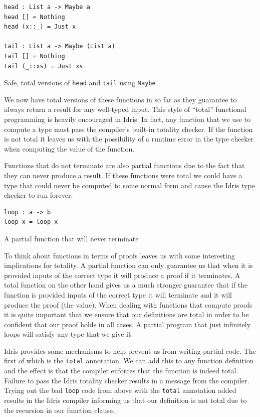 \documentclass[a4paper, notitlepage]{report}
\begin{document}
\begin{listing}[H]
\begin{verbatim}
head : List a -> Maybe a
head [] = Nothing
head (x::_) = Just x

tail : List a -> Maybe (List a)
tail [] = Nothing
tail (_::xs) = Just xs
\end{verbatim}
\caption{Safe, total versions of \texttt{head} and \texttt{tail} using \texttt{Maybe}}
\end{listing}

We now have total versions of these functions in so far as they guarantee to
always return a result for any well-typed input. This style of ``total''
functional programming is heavily encouraged in Idris. In fact, any function
that we use to compute a type must pass the compiler's built-in totality
checker. If the function is not total it leaves us with the possibility of a
runtime error in the type checker when computing the value of the function.

Functions that do not terminate are also partial functions due to the fact that
they can never produce a result. If these functions were total we could have a
type that could never be computed to some normal form and cause the Idris type
checker to run forever.

\begin{listing}[H]
\begin{verbatim}
loop : a -> b
loop x = loop x
\end{verbatim}
\caption{A partial function that will never terminate}
\end{listing}

To think about functions in terms of proofs leaves us with some interesting
implications for totality. A partial function can only guarantee us that when it
is provided inputs of the correct type it will produce a proof if it terminates.
A total function on the other hand gives us a much stronger guarantee that if
the function is provided inputs of the correct type it will terminate and it
will produce the proof (the value). When dealing with functions that compute
proofs it is quite important that we ensure that our definitions are total in
order to be confident that our proof holds in all cases. A partial program that
just infinitely loops will satisfy any type that we give it.

Idris provides some mechanisms to help prevent us from writing partial code. The
first of which is the \texttt{total} annotation. We can add this to any function
definition and the effect is that the compiler enforces that the function is
indeed total. Failure to pass the Idris totality checker results in a message
from the compiler. Trying out the bad \texttt{loop} code from above with the \texttt{total}
annotation added results in the Idris compiler informing us that our definition
is not total due to the recursion in our function clause.
\end{document}
